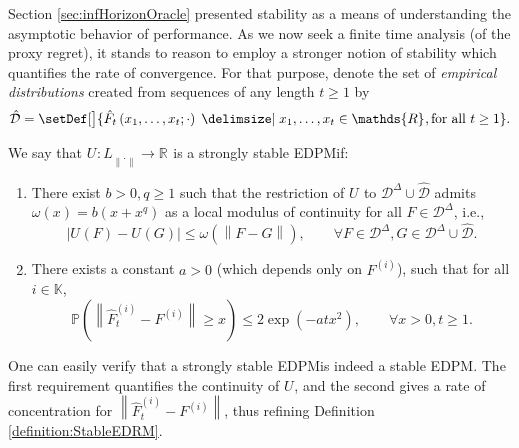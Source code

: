 \documentclass[final,12pt]{colt2018}
\newcommand{\prn}[1]{\left( #1 \right)}
\newcommand{\abs}[1]{\left| #1 \right|}
\newcommand{\norm}[1]{\left\lVert #1 \right\rVert}
\newcommand{\RR}[1][]{\mathds{R}^{#1}}
\newcommand{\PP}[1]{\mathbb{P}\prn{#1}}
\newcommand{\EDRMabbrv}{EDPM}
\newcommand{\policy}[1][]{\pi^{#1}}
\newcommand{\RHat}[1][]{{U}^{#1}}
\newcommand{\RHatFunc}[2][]{\RHat[{#1}] \prn{#2}}
\newcommand{\FHattFunc}[2][t]{\hat{F}_{#1} \prn{#2}}
\newcommand{\FHatPi}[2][\policy]{\hat{F}_{#2}^{#1}}
\newcommand{\Fi}[1][i]{F^{\prn{{#1}}}}
\newcommand{\funcSpace}{L_{\norm{\cdot}}}
\newcommand{\DistSet}{\mathcal{D}}
\newcommand{\DistSetDelta}{\DistSet^{\Delta}}
\newcommand{\EmpDistSet}{\hat{\DistSet}}
\newcommand{\actionSet}{\mathds{K}}
\newcommand{\contMod}{\omega}
\newcommand{\contModFunc}[1]{\contMod \prn{#1}}
\newcommand{\polyContModCoeff}{b}
\newcommand{\polyContModDeg}{q}
\newcommand{\concentrationConst}{a}
\begin{document}
	Section \ref{sec:infHorizonOracle} presented stability as a means of understanding the asymptotic behavior of performance. As we now seek a finite time analysis (of the proxy regret), it stands to reason to employ a stronger notion of stability which quantifies the rate of convergence. For that purpose, denote the set of \textit{empirical distributions} created from sequences of any length $t \ge 1$ by
	\begin{equation*}
		\EmpDistSet = \setDef[\big]{\FHattFunc{x_1,\ldots,x_t; \cdot} \given x_1,\ldots,x_t \in \RR, \text{for all } t \ge 1}.
	\end{equation*}
	\begin{definition}[Strongly stable \EDRMabbrv] \label{definition:StrongEDRM}
		We say that $\RHat: \funcSpace \to \RR$ is a strongly stable \EDRMabbrv\space if:
		\begin{enumerate}
			\item \label{item:StrongEDRMCond1}
			There exist $\polyContModCoeff > 0, \polyContModDeg \ge 1$ such that the restriction of $\RHat$ to $\DistSetDelta \cup \EmpDistSet$ admits $\contModFunc{x} = \polyContModCoeff\prn{x + x^\polyContModDeg}$ as a local modulus of continuity for all $F \in \DistSetDelta$, i.e.,
			\begin{equation*}
			\abs{\RHatFunc{F} - \RHatFunc{G}} \le \contModFunc{\norm{F-G}}, \qquad \forall F \in \DistSetDelta, G \in \DistSetDelta \cup \EmpDistSet.
			\end{equation*}
			\item \label{item:StrongEDRMCond2}
			There exists a constant $\concentrationConst > 0$ (which depends only on $\Fi$), such that for all $i \in \actionSet$,
			\begin{equation*}
			\PP{\norm{\FHatPi[(i)]{t} - \Fi} \ge x} \le 2 \exp \prn{- \concentrationConst t x^2}, \qquad \forall x>0 ,t \ge 1.
			\end{equation*}
		\end{enumerate}
	\end{definition}
	One can easily verify that a strongly stable \EDRMabbrv\space is indeed a stable \EDRMabbrv. The first requirement quantifies the continuity of $\RHat$, and the second gives a rate of concentration for $\norm{\FHatPi[(i)]{t} - \Fi}$, thus refining Definition \ref{definition:StableEDRM}.
	
	
	
	
	
\end{document}

